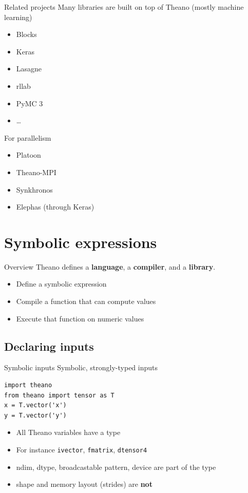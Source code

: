 \documentclass[a4paper,9pt]{beamer}
\begin{document}
\begin{frame}{Related projects}
  Many libraries are built on top of Theano (mostly machine learning)
  \begin{itemize}
    \item Blocks
    \item Keras
    \item Lasagne
    \item rllab
    \item PyMC 3
    \item \ldots
  \end{itemize}
  For parallelism
  \begin{itemize}
    \item Platoon
    \item Theano-MPI
    \item Synkhronos
    \item Elephas (through Keras)
  \end{itemize}
\end{frame}


\section{Symbolic expressions}
\begin{frame}
  \tableofcontents[currentsection]
\end{frame}

\begin{frame}{Overview}
  Theano defines a {\bf language}, a {\bf compiler}, and a {\bf library}.
  \begin{itemize}
    \item Define a symbolic expression
    \item Compile a function that can compute values
    \item Execute that function on numeric values
  \end{itemize}
\end{frame}

\subsection{Declaring inputs}
\begin{frame}[fragile]{Symbolic inputs}
  Symbolic, strongly-typed inputs
  \begin{verbatim}
import theano
from theano import tensor as T
x = T.vector('x')
y = T.vector('y')
  \end{verbatim}

  \begin{itemize}
    \item All Theano variables have a type
    \item For instance \verb|ivector|, \verb|fmatrix|, \verb|dtensor4|
    \item ndim, dtype, broadcastable pattern, device are part of the type
    \item shape and memory layout (strides) are {\bf not}
  \end{itemize}
\end{frame}
\end{document}
